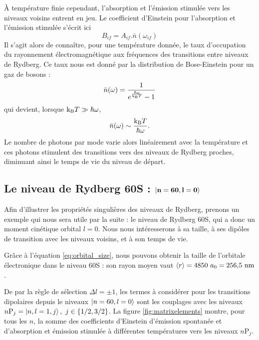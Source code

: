 \`A température finie cependant, l'absorption et l'émission stimulée vers les niveaux voisins entrent en jeu.
Le coefficient d'Einstein pour l'absorption et  l'émission stimulée s'écrit ici
\begin{equation}\label{eq:EinsteinBif}
B_{if} = A_{if} . \bar{n}(\omega_{if})
\end{equation}
Il s'agit alors de connaître, pour une température donnée, le taux d'occupation du rayonnement électromagnétique aux fréquences des transitions entre niveaux de Rydberg.
Ce taux nous est donné par la distribution de Bose-Einstein pour un gaz de bosons \cite{TXT_GORECKIPHYSTAT} :
\begin{equation}\label{eq:BoseStat}
\bar{n}(\omega) = \frac{1}{e^{\frac{\hbar\omega}{\mathrm{k_B} T}}-1}
\end{equation}
qui devient, lorsque $\mathrm{k_B} T \gg \hbar\omega$,
\begin{equation}\label{eq:BoseStat_blackbody}
\bar{n}(\omega) \sim \frac{\mathrm{k_B} T}{\hbar\omega}.
\end{equation}
Le nombre de photons par mode varie alors linéairement avec la température et ces photons stimulent des transitions vers des niveaux de Rydberg proches, diminuant ainsi le temps de vie du niveau de départ.


	\subsection{Le niveau de Rydberg 60S : $\mathbf{\ket{n=60,l=0}}$}
\noindent Afin d'illustrer les propriétés singulières des niveaux de Rydberg, prenons un exemple qui nous sera utile par la suite : le niveau de Rydberg 60S, qui a donc un moment cinétique orbital $l=0$. Nous nous intéresserons à sa taille, à ses dipôles de transition avec les niveaux voisins, et à son temps de vie.

Grâce à l'équation \eqref{eq:orbital_size}, nous pouvons obtenir la taille de l'orbitale électronique dans le niveau 60S : son rayon moyen vaut $\braket{r} = 4850~a_0 = \numv{256.5}\si{\nano\meter}$.

De par la règle de sélection $\Delta l=\pm1$, les termes à considérer pour les transitions dipolaires depuis le niveaux $\ket{n=60,l=0}$ sont les couplages avec les niveaux $n\mathrm{P}_j = \ket{n,l=1,j},~j\in\{1/2,3/2\}$.
La figure \eqref{fig:matrixelements} montre, pour tous les $n$, la somme des coefficients d'Einstein d'émission spontanée et d'absorption et émission stimulée à différentes températures vers les niveaux $n\mathrm{P}_j$.

